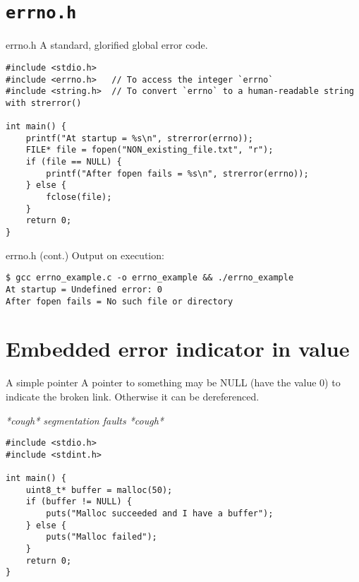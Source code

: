 \documentclass[aspectratio=169,14pt]{beamer}
\begin{document}
\section{\texttt{errno.h}}

\begin{frame}[fragile]{errno.h}
A standard, glorified global error code.

\begin{lstlisting}[style=cstyle]
#include <stdio.h>
#include <errno.h>   // To access the integer `errno`
#include <string.h>  // To convert `errno` to a human-readable string with strerror()

int main() {
    printf("At startup = %s\n", strerror(errno));
    FILE* file = fopen("NON_existing_file.txt", "r");
    if (file == NULL) {
        printf("After fopen fails = %s\n", strerror(errno));
    } else {
        fclose(file);
    }
    return 0;
}
\end{lstlisting}
\end{frame}

\begin{frame}[fragile]{errno.h (cont.)}
Output on execution:

\begin{lstlisting}[style=nostyle]
$ gcc errno_example.c -o errno_example && ./errno_example
At startup = Undefined error: 0
After fopen fails = No such file or directory
\end{lstlisting}
\end{frame}


\section{Embedded error indicator in value}

\begin{frame}[fragile]{A simple pointer}
A pointer to something may be NULL (have the value 0) to indicate the broken link.
Otherwise it can be dereferenced.

\textit{*cough* segmentation faults *cough*}

\begin{lstlisting}[style=cstyle]
#include <stdio.h>
#include <stdint.h>

int main() {
    uint8_t* buffer = malloc(50);
    if (buffer != NULL) {
        puts("Malloc succeeded and I have a buffer");
    } else {
        puts("Malloc failed");
    }
    return 0;
}
\end{lstlisting}
\end{frame}
\end{document}
